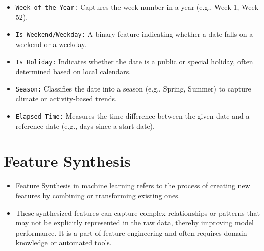 \documentclass[serif, aspectratio=169]{beamer}
\begin{document}
\begin{frame}
    \begin{itemize}
        \item \texttt{\color{purple}Week of the Year:} Captures the week number in a year (e.g., Week 1, Week 52).
        \item \texttt{\color{purple}Is Weekend/Weekday:} A binary feature indicating whether a date falls on a weekend or a weekday.
        \item \texttt{\color{purple}Is Holiday:} Indicates whether the date is a public or special holiday, often determined based on local calendars.
        \item \texttt{\color{purple}Season:} Classifies the date into a season (e.g., Spring, Summer) to capture climate or activity-based trends.
        \item \texttt{\color{purple}Elapsed Time:} Measures the time difference between the given date and a reference date (e.g., days since a start date).
    \end{itemize}
\end{frame}

\section{Feature Synthesis}

\begin{frame}
    \begin{itemize}
        \item Feature Synthesis in machine learning refers to the process of creating new features by combining or transforming existing ones. 
        \item These synthesized features can capture complex relationships or patterns that may not be explicitly represented in the raw data, thereby improving model performance. It is a part of feature engineering and often requires domain knowledge or automated tools.
    \end{itemize}
\end{frame}
\end{document}
